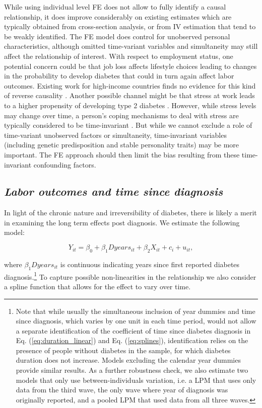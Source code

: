 \documentclass[12pt,english]{article}
\begin{document}
While using individual level \ac{FE} does not allow to fully identify a causal relationship, it does improve considerably on existing estimates which are typically obtained from cross-section analysis, or from \ac{IV} estimation that tend to be weakly identified.  The FE model does control for unobserved personal characteristics, although omitted time-variant variables and simultaneity may still affect the relationship of interest. With respect to employment status, one potential concern could be that job loss affects lifestyle choices leading to changes in the probability to develop diabetes that could in turn again affect labor outcomes. Existing work for high-income countries finds no evidence for  this kind of reverse causality \parencite{Bergemann2011,Schaller2015}. Another possible channel might be that stress at work leads to a higher propensity of developing type 2 diabetes \parencite{Heraclides2012,Eriksson2013}. However, while stress levels may change over time, a person’s coping mechanisms to deal with stress are typically considered to be time-invariant \parencite{Schneiderman2005}. But while we cannot exclude a role of time-variant unobserved factors or simultaneity, time-invariant variables (including genetic predisposition and stable personality traits) may be more important. The \ac{FE} approach should then limit the bias resulting from these time-invariant confounding factors.


\subsection{\textit{Labor outcomes and time since diagnosis}}

In light of the chronic nature and irreversibility of diabetes, there is likely a merit in examining the long term effects post diagnosis.  We estimate the following model:

\begin{equation}
Y_{it}=\beta_{0}+\beta_{1}Dyears_{it}+\beta_{2}X_{it}+c_{i}+u_{it},\label{eq:duration_linear}
\end{equation}

\noindent where $\beta_{1}Dyears_{it}$ is continuous indicating years since first reported diabetes diagnosis.\footnote{Note that while usually the simultaneous inclusion of year dummies and time since diagnosis, which varies by one unit in each time period, would not allow a separate identification of the coefficient of time since diabetes diagnosis in Eq.  (\ref{eq:duration_linear}) and Eq.  (\ref{eq:splines}), identification relies on the presence of people without diabetes in the sample, for which diabetes duration does not increase.  Models excluding the calendar year dummies provide similar results.  As a further robustness check, we also estimate two models that only use between-individuals variation, i.e. a \ac{LPM} that uses only data from the third wave, the only wave where year of diagnosis was originally reported, and a pooled \ac{LPM} that used data from all three waves.} To capture possible non-linearities in the relationship we also consider a spline function that allows for the effect to vary over time.
\end{document}
